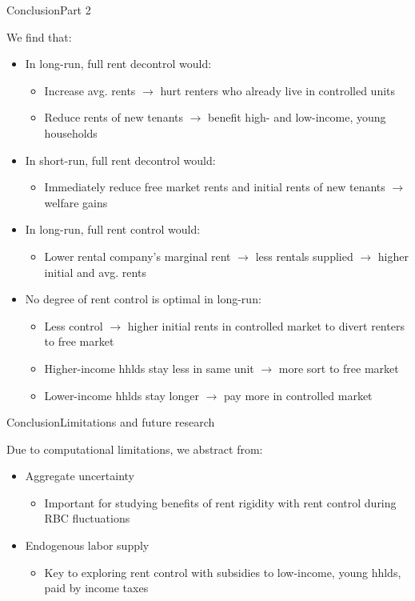 \documentclass[11pt,aspectratio=169]{beamer}
\begin{document}
\begin{frame}{Conclusion}{Part 2}

We find that:
\begin{itemize}
    \item In long-run, full rent decontrol would:
    \begin{itemize}
        \item Increase avg. rents $\rightarrow$ hurt renters who already live in controlled units
        \item Reduce rents of new tenants $\rightarrow$ benefit high- and low-income, young households
    \end{itemize}
    \item In short-run, full rent decontrol would:
    \begin{itemize}
        \item Immediately reduce free market rents and initial rents of new tenants $\rightarrow$ welfare gains
    \end{itemize}
    \item In long-run, full rent control would:
    \begin{itemize}
        \item Lower rental company's marginal rent $\rightarrow$ less rentals supplied $\rightarrow$ higher initial and avg. rents
    \end{itemize} 
    \item No degree of rent control is optimal in long-run:
    \begin{itemize}
        \item Less control $\rightarrow$ higher initial rents in controlled market to divert renters to free market
        \item Higher-income hhlds stay less in same unit $\rightarrow$ more sort to free market  
        \item Lower-income hhlds stay longer $\rightarrow$ pay more in controlled market
    \end{itemize}    
\end{itemize}
    
\end{frame}

\begin{frame}{Conclusion}{Limitations and future research}

Due to computational limitations, we abstract from:
\begin{itemize}
    \item Aggregate uncertainty
    \begin{itemize}
        \item Important for studying benefits of rent rigidity with rent control during RBC fluctuations
    \end{itemize}
    \item Endogenous labor supply
    \begin{itemize}
        \item Key to exploring rent control with subsidies to low-income, young hhlds, paid by income taxes
    \end{itemize}
\end{itemize}
 
\end{frame}
\end{document}
